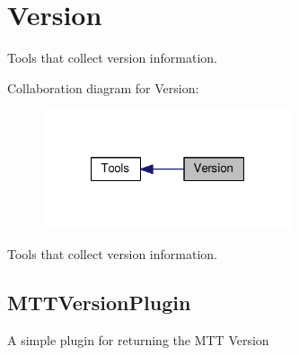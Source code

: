 \hypertarget{group___version}{\section{Version}
\label{group___version}
}


Tools that collect version information.  


Collaboration diagram for Version\-:
\nopagebreak
\begin{figure}[H]
\begin{center}
\leavevmode
\includegraphics[width=208pt]{group___version}
\end{center}
\end{figure}
Tools that collect version information. \hypertarget{group___version_MTTVersionPlugin}{}\subsection{M\-T\-T\-Version\-Plugin}\label{group___version_MTTVersionPlugin}
A simple plugin for returning the M\-T\-T Version 